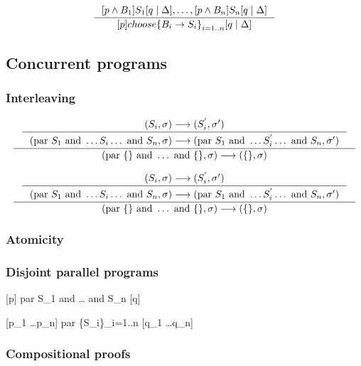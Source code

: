\documentclass[12pt, a4paper]{book}
\begin{document}
  $$
  \inference{[p \land B_1] S_1 [q \mid \Delta], \ldots, [p \land B_n] S_n [q \mid \Delta]}
  {[p] choose {\{B_i \rightarrow S_i\}}_{i=1..n} [q \mid \Delta]}
  $$

  \subsection{Concurrent programs}
  \label{sub:Concurrent programs}

  

  \subsubsection{Interleaving}
  \label{subs:Interleaving}

  $$
  \inference{
      \inference{(S_i,\sigma) \longrightarrow (S_{i}^{'}, \sigma')}
      {(\textrm{par }S_1\textrm{ and }\ldots S_i \ldots\textrm{ and }S_n, \sigma) \longrightarrow (\textrm{par }S_1\textrm{ and }\ldots S_{i}^{'} \ldots\textrm{ and }S_n, \sigma')}
  }
  {(\textrm{par }\{\}\textrm{ and }\ldots\textrm{ and }\{\}, \sigma) \longrightarrow (\{\}, \sigma)}
  $$

  $$
  \inference{
    \inference{(S_i, \sigma) \longrightarrow (S_{i}^{'}, \sigma')}
    {(\textrm{par }S_1\textrm{ and }\ldots S_i \ldots\textrm{ and }S_n, \sigma) \longrightarrow (\textrm{par }S_1\textrm{ and }\ldots S_{i}^{'}\ldots\textrm{ and } S_n, \sigma')}
  }
  {(\textrm{par } \{\}\textrm{ and }\ldots\textrm{ and }\{\}, \sigma) \longrightarrow (\{\},\sigma)}
  $$
  \subsubsection{Atomicity}
  \label{subs:Atomicity}
  \subsubsection{Disjoint parallel programs}
  \label{subs:Disjoint parallel programs}

  {[p]\textrm{ par } S_1\textrm{ and }\ldots\textrm{ and }S_n [q]}

  {[p_1 \land \ldots \land p_n]\textrm{ par }{\{S_i\}}_{i=1..n} [q_1 \land \ldots \land q_n]}
  \subsubsection{Compositional proofs}
  \label{subs:Compositional proofs}
\end{document}
